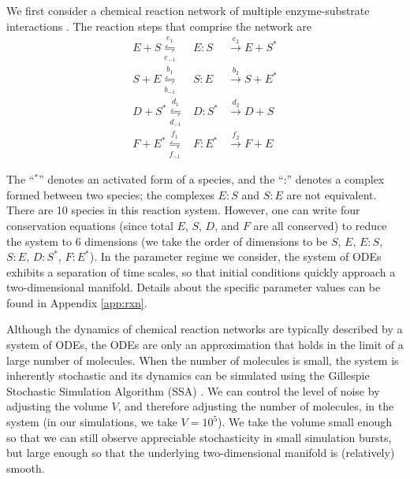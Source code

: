 \documentclass[aip,jcp,preprint]{revtex4-1}
\begin{document}
We first consider a chemical reaction network of multiple enzyme-substrate interactions \cite{zagaris2012stability}.
%
The reaction steps that comprise the network are\\
\begin{equation}
\begin{array}{rcl}
E + S \overset{e_1}{\underset{e_{-1}}{\leftrightharpoons}} & E:S & \overset{e_2}{\rightarrow} E + S^{*} \\
S + E \overset{b_1}{\underset{b_{-1}}{\leftrightharpoons}} & S:E & \overset{b_2}{\rightarrow} S + E^{*}\\
D + S^{*} \overset{d_1}{\underset{d_{-1}}{\leftrightharpoons}} & D:S^{*} & \overset{d_2}{\rightarrow} D + S\\
F + E^{*} \overset{f_1}{\underset{f_{-1}}{\leftrightharpoons}} & F:E^{*} & \overset{f_2}{\rightarrow} F + E
\end{array}
\end{equation}

The ``$^{*}$'' denotes an activated form of a species, and the ``:'' denotes a complex formed between two species; the complexes $E:S$ and $S:E$ are not equivalent.
%
There are 10 species in this reaction system.
%
However, one can write four conservation equations (since total $E$, $S$, $D$, and $F$ are all conserved) to reduce the system to 6 dimensions
(we take the order of dimensions to be $S$, $E$, $E:S$, $S:E$, $D:S^{*}$, $F:E^{*}$).
%
In the parameter regime we consider, the system of ODEs exhibits a separation of time scales, so that initial conditions quickly approach a two-dimensional manifold.
%
Details about the specific parameter values can be found in Appendix \ref{app:rxn}.

Although the dynamics of chemical reaction networks are typically described by a system of ODEs, the ODEs are only an approximation that holds in the limit of a large number of molecules.
%
When the number of molecules is small, the system is inherently stochastic and its dynamics can be simulated using the Gillespie Stochastic Simulation Algorithm (SSA) \cite{gillespie1977exact}.
%
We can control the level of noise by adjusting the volume $V$, and therefore adjusting the number of molecules, in the system (in our simulations, we take $V=10^5$).
%
We take the volume small enough so that we can still observe appreciable stochasticity in small simulation bursts, but large enough so that the underlying two-dimensional manifold is (relatively) smooth.
\end{document}
